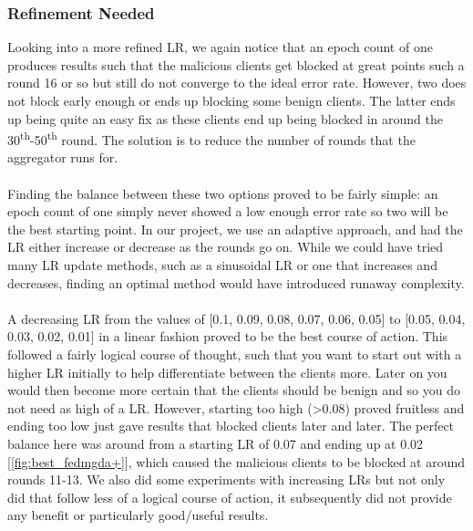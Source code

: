 \subsubsection{Refinement Needed}
Looking into a more refined LR, we again notice that an epoch count of one produces results such that the malicious clients get blocked at great points such a round 16 or so but still do not converge to the ideal error rate.
However, two does not block early enough or ends up blocking some benign clients.
The latter ends up being quite an easy fix as these clients end up being blocked in around the 30\textsuperscript{th}-50\textsuperscript{th} round.
The solution is to reduce the number of rounds that the aggregator runs for.
\\ \\
Finding the balance between these two options proved to be fairly simple: an epoch count of one simply never showed a low enough error rate so two will be the best starting point.
In our project, we use an adaptive approach, and had the LR either increase or decrease as the rounds go on. 
While we could have tried many LR update methods, such as a sinusoidal LR or one that increases and decreases, finding an optimal method would have introduced runaway complexity.
\\ \\ 
A decreasing LR from the values of [0.1, 0.09, 0.08, 0.07, 0.06, 0.05] to [0.05, 0.04, 0.03, 0.02, 0.01] in a linear fashion proved to be the best course of action.
This followed a fairly logical course of thought, such that you want to start out with a higher LR initially to help differentiate between the clients more.
Later on you would then become more certain that the clients should be benign and so you do not need as high of a LR.
However, starting too high (\textgreater0.08) proved fruitless and ending too low just gave results that blocked clients later and later.
The perfect balance here was around from a starting LR of 0.07 and ending up at 0.02 [\ref{fig:best_fedmgda+}], which caused the malicious clients to be blocked at around rounds 11-13.
We also did some experiments with increasing LRs but not only did that follow less of a logical course of action, it subsequently did not provide any benefit or particularly good/useful results.

